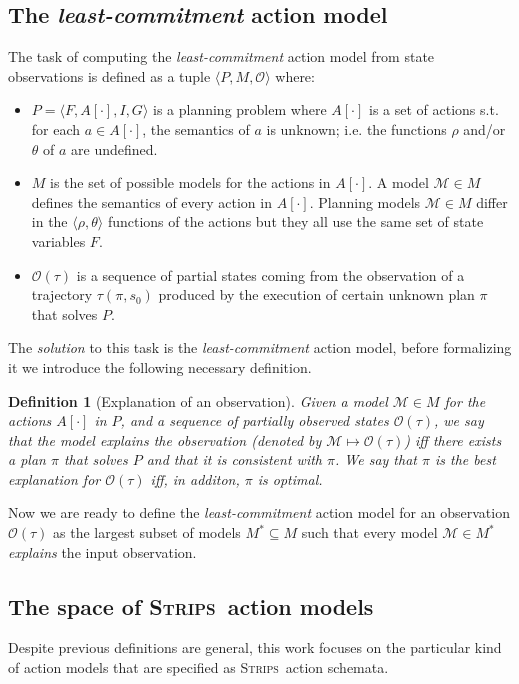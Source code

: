 \documentclass{article}
\newcommand{\tup}[1]{{\langle #1 \rangle}}
\newcommand{\strips}{\textsc{Strips}}
\newtheorem{definition}[theorem]{Definition}
\begin{document}
\subsection{The {\em least-commitment} action model}
The task of computing the {\em least-commitment} action model from state observations is defined as a tuple $\tup{P,M,\mathcal{O}}$ where:
\begin{itemize}
\item $P=\tup{F,A[\cdot],I,G}$ is a planning problem where $A[\cdot]$ is a set of actions s.t. for each $a\in A[\cdot]$, the semantics of $a$ is unknown; i.e. the functions $\rho$ and/or $\theta$ of $a$ are undefined. 
\item $M$ is the set of possible models for the actions in $A[\cdot]$. A model $\mathcal{M}\in M$ defines the semantics of every action in $A[\cdot]$. Planning models $\mathcal{M}\in M$ differ in the $\tup{\rho,\theta}$ functions of the actions but they all use the same set of state variables $F$.
\item $\mathcal{O}(\tau)$ is a sequence of partial states coming from the observation of a trajectory $\tau(\pi,s_0)$ produced by the execution of certain unknown plan $\pi$ that solves $P$.
\end{itemize}

The {\em solution} to this task is the {\em least-commitment} action model, before formalizing it we introduce the following necessary definition.

\begin{definition}[Explanation of an observation]
Given a model $\mathcal{M}\in M$ for the actions $A[\cdot]$ in $P$, and a sequence of partially observed states $\mathcal{O}(\tau)$, we say that {\em the model explains the observation} (denoted by $\mathcal{M}\mapsto\mathcal{O}(\tau)$) iff there exists a plan $\pi$ that solves $P$ and that it is consistent with $\pi$. We say that $\pi$ is the {\em best explanation} for $\mathcal{O}(\tau)$ iff, in additon, $\pi$ is optimal.
\end{definition}

Now we are ready to define the {\em least-commitment} action model for an observation $\mathcal{O}(\tau)$ as the largest subset of models $M^*\subseteq M$ such that every model $\mathcal{M}\in M^*$ {\em explains} the input observation.


\subsection{The space of \strips\ action models}
Despite previous definitions are general, this work focuses on the particular kind of action models that are specified as \strips\ action schemata. 
\end{document}
